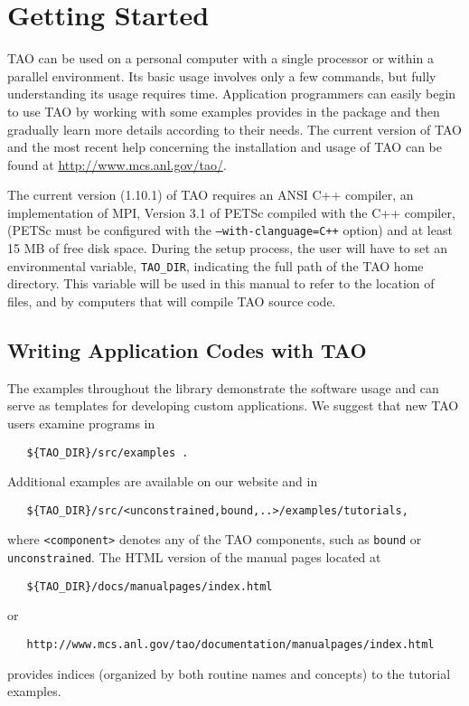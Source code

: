 \chapter{Getting Started}
\label{chapter:intro_tao}

TAO can be used on a personal
computer with a single processor or within a parallel environment.  
Its basic usage involves only a few commands, but fully 
understanding its usage requires time.
Application programmers can easily begin to use TAO by working with 
some examples provides in the package
and then gradually learn more details according to
their needs.  The current version of TAO and the most recent help 
concerning the installation and usage of TAO can be found at  
\url{http://www.mcs.anl.gov/tao/}.

The current version (1.10.1) of TAO requires an ANSI C++ compiler, 
an implementation of MPI, Version 3.1 of PETSc compiled with the C++ 
compiler, (PETSc must be configured with the \texttt{--with-clanguage=C++}
option) and at 
least 15 MB of free disk space.
During the setup process, the user will have to set an environmental
variable, \texttt{TAO\_DIR}, indicating the full path of 
the TAO home directory.
This variable will be used in this
manual to refer to the location of files, and by computers that
will compile TAO source code.

\section{Writing Application Codes with TAO}

The examples throughout the library demonstrate the software usage and
can serve as templates for developing custom applications.  We suggest
that new TAO users examine programs in
\begin{verbatim}
   ${TAO_DIR}/src/examples .
\end{verbatim} %
\noindent
Additional examples are available on our website and in
\begin{verbatim}
   ${TAO_DIR}/src/<unconstrained,bound,..>/examples/tutorials,
\end{verbatim} 
\noindent
where \texttt{<component>}
denotes any of the TAO components, such as 
\texttt{bound} or \texttt{unconstrained}.
The HTML version of the manual pages located at
\begin{verbatim}
   ${TAO_DIR}/docs/manualpages/index.html
\end{verbatim} %
\noindent
or
\begin{verbatim}
   http://www.mcs.anl.gov/tao/documentation/manualpages/index.html
\end{verbatim}
\noindent
provides indices (organized by both routine names and concepts) to the
tutorial examples.

